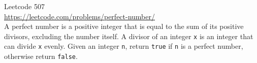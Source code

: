  Leetcode 507 \\
  \url{https://leetcode.com/problems/perfect-number/} \\
  A perfect number is a positive integer that is equal to the sum of its
  positive divisors, excluding the number itself.
  A divisor of an integer \verb!x! is an integer that can divide \verb!x!
  evenly.
  Given an integer \verb!n!, return \verb!true! if \verb!n! is a perfect number,
  otherwise return \verb!false!.
